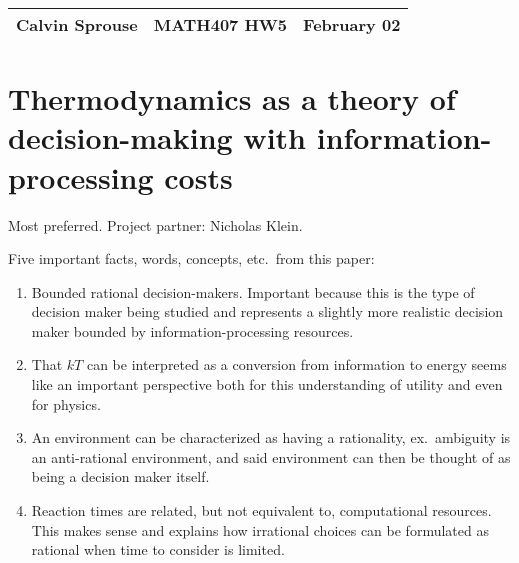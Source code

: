 \documentclass[a4paper, 12pt]{config/homework}
\begin{document}
\noindent
\begin{tabularx}{\textwidth}{>{\centering\arraybackslash}X>{\centering\arraybackslash}X>{\centering\arraybackslash}X}
Calvin Sprouse & MATH407 HW5 & 2024 February 02\\
\midrule
\end{tabularx}


\section{Thermodynamics as a theory of decision-making with information-processing costs}
Most preferred. Project partner: Nicholas Klein.

\noindent
Five important facts, words, concepts, etc.\ from this paper:
\begin{enumerate}
\item Bounded rational decision-makers. Important because this is the type of decision maker being studied and represents a slightly more realistic decision maker bounded by information-processing resources.
\item That \(kT\) can be interpreted as a conversion from information to energy seems like an important perspective both for this understanding of utility and even for physics.
\item An environment can be characterized as having a rationality, ex.\ ambiguity is an anti-rational environment, and said environment can then be thought of as being a decision maker itself.
\item Reaction times are related, but not equivalent to, computational resources. This makes sense and explains how irrational choices can be formulated as rational when time to consider is limited.
\end{enumerate}
\end{document}
